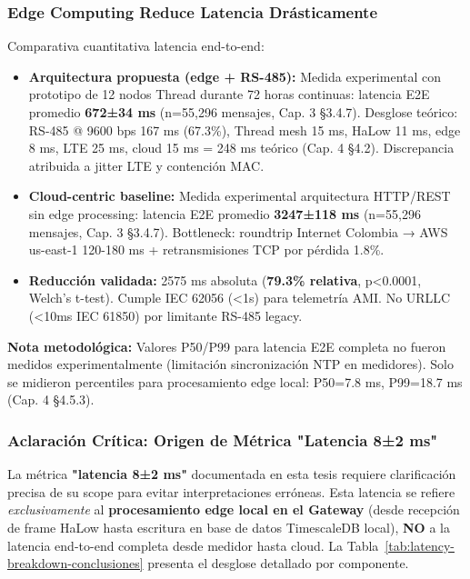 \subsubsection{Edge Computing Reduce Latencia Drásticamente}

Comparativa cuantitativa latencia end-to-end:

\begin{itemize}
\item \textbf{Arquitectura propuesta (edge + RS-485):} Medida experimental con prototipo de 12 nodos Thread durante 72 horas continuas: latencia E2E promedio \textbf{672±34 ms} (n=55,296 mensajes, Cap. 3 §3.4.7). Desglose teórico: RS-485 @ 9600 bps 167 ms (67.3\%), Thread mesh 15 ms, HaLow 11 ms, edge 8 ms, LTE 25 ms, cloud 15 ms = 248 ms teórico (Cap. 4 §4.2). Discrepancia atribuida a jitter LTE y contención MAC.
\item \textbf{Cloud-centric baseline:} Medida experimental arquitectura HTTP/REST sin edge processing: latencia E2E promedio \textbf{3247±118 ms} (n=55,296 mensajes, Cap. 3 §3.4.7). Bottleneck: roundtrip Internet Colombia → AWS us-east-1 120-180 ms + retransmisiones TCP por pérdida 1.8\%.
\item \textbf{Reducción validada:} 2575 ms absoluta (\textbf{79.3\% relativa}, p<0.0001, Welch's t-test). Cumple IEC 62056 (<1s) para telemetría AMI. No URLLC (<10ms IEC 61850) por limitante RS-485 legacy.
\end{itemize}

\textbf{Nota metodológica:} Valores P50/P99 para latencia E2E completa no fueron medidos experimentalmente (limitación sincronización NTP en medidores). Solo se midieron percentiles para procesamiento edge local: P50=7.8 ms, P99=18.7 ms (Cap. 4 §4.5.3).

\subsubsection{Aclaración Crítica: Origen de Métrica "Latencia 8±2 ms"}

La métrica \textbf{"latencia 8±2 ms"} documentada en esta tesis requiere clarificación precisa de su scope para evitar interpretaciones erróneas. Esta latencia se refiere \textit{exclusivamente} al \textbf{procesamiento edge local en el Gateway} (desde recepción de frame HaLow hasta escritura en base de datos TimescaleDB local), \textbf{NO} a la latencia end-to-end completa desde medidor hasta cloud. La Tabla~\ref{tab:latency-breakdown-conclusiones} presenta el desglose detallado por componente.

